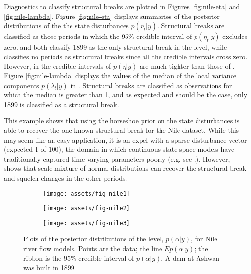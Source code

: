 \documentclass{article}
\begin{document}
Diagnostics to classify structural breaks are plotted in Figures \ref{fig:nile-eta} and \ref{fig:nile-lambda}.
Figure \ref{fig:nile-eta} displays summaries of the posterior distributions of the the state disturbances $p(\eta_{t} | y)$.
Structural breaks are classified as those periods in which the 95\% credible interval of $p(\eta_{t} | y)$ excludes zero.
 and  both classify 1899 as the only structural break in the level, while  classifies no periods as structural breaks since all the credible intervals cross zero.
However, in  the credible intervals of $p(\eta|y)$ are much tighter than those of .
Figure \ref{fig:nile-lambda} displays the values of the median of the local variance components $p(\lambda_{t} | y)$ in .
Structural breaks are classified as observations for which the median is greater than 1, and as expected and should be the case, only 1899 is classified as a structural break.

This example shows that using the horseshoe prior on the state disturbances is able to recover the one known structural break for the Nile dataset.
While this may seem like an easy application, it is an expel with a sparse disturbance vector (expected 1 of 100), the domain in which continuous state space models have traditionally captured time-varying-parameters poorly (e.g. see .).
However, shows that scale mixture of normal distributions can recover the structural break and squelch changes in the other periods.

\begin{figure}[htpb]
  \centering
  \begin{subfigure}{1.0\textwidth}
    \texttt{[image: assets/fig-nile1]}
    \caption{}
    \label{fig:nile-posterior-1}    
  \end{subfigure}
  \begin{subfigure}{1.0\textwidth}
    \texttt{[image: assets/fig-nile2]}
    \caption{}
    \label{fig:nile-posterior-2}
  \end{subfigure}
  \begin{subfigure}{1.0\textwidth}
    \texttt{[image: assets/fig-nile3]}
    \caption{}
    \label{fig:nile-posterior-3}
  \end{subfigure}
  \caption{Plots of the posterior distributions of the level, $p(\alpha | y)$, for Nile river flow models. Points are the data; the line $E p(\alpha | y)$; the ribbon is the 95\% credible interval of $p(\alpha | y)$. A dam at Ashwan was built in 1899}
  \label{fig:nile-posterior}
\end{figure}
\end{document}
